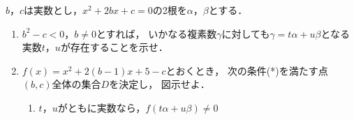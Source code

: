 \documentclass[../../main.tex]{subfiles}
\begin{document}
$b$，$c$は実数とし，$x^2+2bx+c=0$の2根を$\alpha$，$\beta$とする．
\begin{enumerate}
  \item[(i)] $b^2-c<0$，$b\neq0$とすれば，
    いかなる複素数$\gamma$に対しても$\gamma=t\alpha+u\beta$となる実数$t$，$u$が存在することを示せ．
  \item[(ii)] $f(x)=x^2+2(b-1)x+5-c$とおくとき，
    次の条件(*)を満たす点$(b,c)$全体の集合$D$を決定し，
    図示せよ．
    \begin{enumerate}
      \item[(*)]$t$，$u$がともに実数なら，$f(t\alpha+u\beta)\neq0$
    \end{enumerate}
\end{enumerate}
\end{document}
